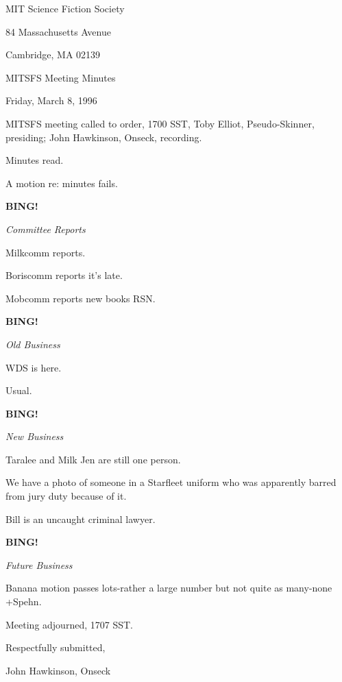 \documentclass[12pt]{article}
\newcommand{\bing}{{\bf BING!} }
\newcommand{\goto}[1]{\bing \vskip 12pt \centerline{{\em{#1}}}}
\begin{document}
\begin{center}

MIT Science Fiction Society 

84 Massachusetts Avenue

Cambridge, MA 02139

\vspace{12pt}

MITSFS Meeting Minutes 

Friday, March 8, 1996

\end{center}
 
\vspace{18pt}

\setlength{\parskip}{6pt}

\noindent
MITSFS meeting called to order, 1700 SST,
Toby Elliot, Pseudo-Skinner, presiding; John Hawkinson, Onseck, recording.

Minutes read.

A motion re: minutes fails.

\goto{Committee Reports}

Milkcomm reports.

Boriscomm reports it's late.

Mobcomm reports new books RSN.

\goto{Old Business}

WDS is here.

Usual.

\goto{New Business}

Taralee and Milk Jen are still one person.

We have a photo of someone in a Starfleet uniform who was apparently barred from jury duty because of it.

Bill is an uncaught criminal lawyer.

\goto{Future Business}

Banana motion passes lots-rather a large number but not quite as many-none +Spehn.

\vspace{12pt}

\noindent
Meeting adjourned, 1707 SST.

\vspace{18pt}

\centerline{Respectfully submitted,}
\centerline{John Hawkinson, Onseck}
\end{document}

